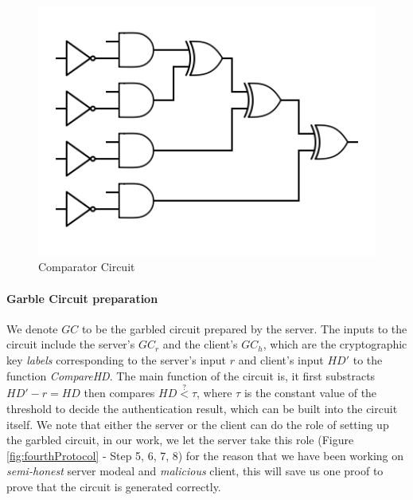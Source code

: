 \begin{figure}[htbp!] 
  \centering    
  \includegraphics[width=1.0\textwidth]{Chapter7/Figs/Raster/comparisionCircuit}
  \caption{Comparator Circuit}
  \label{fig:comparisionCircuit}
\end{figure}

\paragraph{Garble Circuit preparation}
We denote \(GC\) to be the garbled circuit prepared by the server. The inputs to
the circuit include the server's \(GC_{r}\) and the client's \(GC_{h}\), which
are the cryptographic key \textit{labels} corresponding to the server's input
\(r\) and client's input \(HD'\) to the function \textit{CompareHD}. The main
function of the circuit is, it first substracts \(HD' - r = HD\) then compares
\(HD \stackrel{?}{<} \tau\), where \(\tau\) is the constant value of the
threshold to decide the authentication result, which can be built into the
circuit itself. We note that either the server or the client can do the role of
setting up the garbled circuit, in our work, we let the server take this role
(Figure \ref{fig:fourthProtocol} - Step 5, 6, 7, 8) for the reason that we have
been working on \textit{semi-honest} server modeal and \textit{malicious }
client, this will save us one proof to prove that the circuit is generated
correctly.

